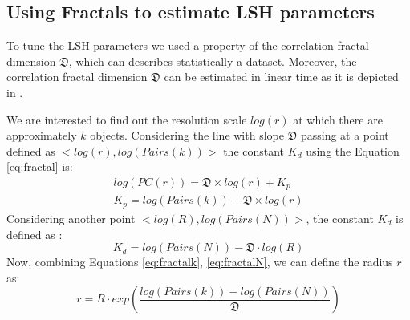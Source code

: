 \documentclass[conference]{IEEEtran}
\begin{document}



\subsection{Using Fractals to estimate LSH parameters}
	 	 
 
To tune the LSH parameters we used  a property of the   correlation fractal dimension $\mathfrak{D}$, which can  describes statistically a dataset.  Moreover, the correlation fractal dimension $\mathfrak{D}$ can be estimated in linear time as it is depicted in \cite{traina2010fast}. 

We are interested to find out  the resolution scale $log(r)$ at which there are approximately $k$ objects.  Considering the line with slope $\mathfrak{D}$ passing at  a point defined as $  <log (r), log (Pairs(k))>$  the   constant $K_d$ using the Equation \ref{eq:fractal} is:
\begin{eqnarray}\label{eq:fractalk}
	   log(PC(r)) = \mathfrak{D} \times log (r) + K_p \nonumber\\
	   K_p   = log (Pairs (k)) - \mathfrak{D} \times log (r)
\end{eqnarray} 
Considering  another point   $  <log (R), log (Pairs(N))>$, the   constant $K_d$  is defined as :
\begin{equation}\label{eq:fractalN}
    K_d    = log (Pairs(N)) - \mathfrak{D} \cdot log (R) 
\end{equation} 
Now, combining Equations \ref{eq:fractalk}, \ref{eq:fractalN}, we can define  the radius  $r$ as:    	
\begin{equation}\label{eq:fractalR}
  r  =  R \cdot  exp (  \frac{log (Pairs (k)) - log (Pairs(N))}{ \mathfrak{D} } )    
\end{equation}
\end{document}

